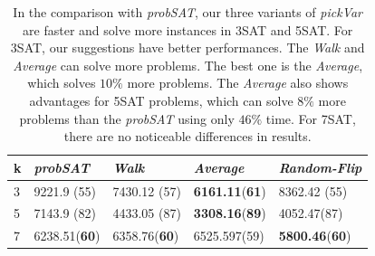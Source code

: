\documentclass[12pt,a4paper,twoside]{scrartcl}
\numberwithin{equation}{section}
\begin{document}
\begin{table}[h!]
\begin{center}
    \begin{tabular}{|l|l|l|l|p{3cm}|}
\hline 
    k &\emph{probSAT}&\emph{Walk}&\emph{Average}&\emph{Random-Flip} \\ \hline
	3&9221.9 (55)&7430.12 (57)&\textbf{6161.11}(\textbf{61})&8362.42 (55) \\ \hline
	5&7143.9 (82)&4433.05 (87)&\textbf{3308.16}(\textbf{89})&4052.47(87)\\ \hline

	7& 	6238.51(\textbf{60})& 6358.76(\textbf{60})&6525.597(59)&\textbf{5800.46}(\textbf{60})\\ \hline
	
\end{tabular}
\caption{In the comparison with \emph{probSAT}, our three variants of \emph{pickVar} are faster and solve more instances in 3SAT and 5SAT. For 3SAT, our suggestions have better performances. The \emph{Walk} and \emph{Average} can solve more problems. The best one is the \emph{Average}, which solves $10\%$ more problems. The \emph{Average} also shows advantages for 5SAT problems, which can solve $8\%$ more problems than the \emph{probSAT} using only $46\%$ time. For 7SAT, there are no noticeable differences in results.}
\end{center}
\end{table} 
\end{document}
